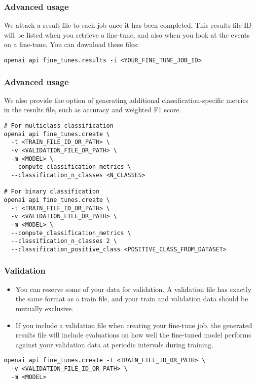 \begin{frame}[fragile]\frametitle{Advanced usage}


We attach a result file to each job once it has been completed. This results file ID will be listed when you retrieve a fine-tune, and also when you look at the events on a fine-tune. You can download these files:


\begin{lstlisting}
openai api fine_tunes.results -i <YOUR_FINE_TUNE_JOB_ID>
\end{lstlisting}	
\end{frame}




\begin{frame}[fragile]\frametitle{Advanced usage}

We also provide the option of generating additional classification-specific metrics in the results file, such as accuracy and weighted F1 score.



\begin{lstlisting}
# For multiclass classification
openai api fine_tunes.create \
  -t <TRAIN_FILE_ID_OR_PATH> \
  -v <VALIDATION_FILE_OR_PATH> \
  -m <MODEL> \
  --compute_classification_metrics \
  --classification_n_classes <N_CLASSES>

# For binary classification
openai api fine_tunes.create \
  -t <TRAIN_FILE_ID_OR_PATH> \
  -v <VALIDATION_FILE_OR_PATH> \
  -m <MODEL> \
  --compute_classification_metrics \
  --classification_n_classes 2 \
  --classification_positive_class <POSITIVE_CLASS_FROM_DATASET>
\end{lstlisting}	
\end{frame}

\begin{frame}[fragile]\frametitle{Validation}

\begin{itemize}
\item You can reserve some of your data for validation. A validation file has exactly the same format as a train file, and your train and validation data should be mutually exclusive.
\item 
If you include a validation file when creating your fine-tune job, the generated results file will include evaluations on how well the fine-tuned model performs against your validation data at periodic intervals during training.
\end{itemize}


\begin{lstlisting}
openai api fine_tunes.create -t <TRAIN_FILE_ID_OR_PATH> \
  -v <VALIDATION_FILE_ID_OR_PATH> \
  -m <MODEL>
\end{lstlisting}	
\end{frame}


